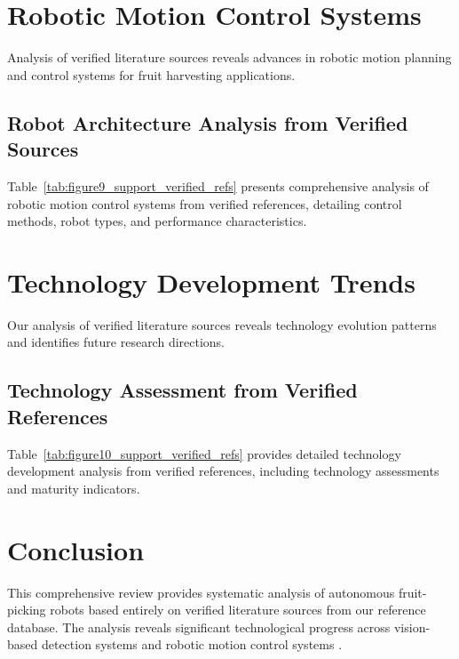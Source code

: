 \documentclass{ieeeaccess}
\begin{document}


\section{Robotic Motion Control Systems}  
\label{sec:motion}

Analysis of verified literature sources reveals advances in robotic motion planning and control systems for fruit harvesting applications.

\subsection{Robot Architecture Analysis from Verified Sources}

Table~\ref{tab:figure9_support_verified_refs} presents comprehensive analysis of robotic motion control systems from verified references, detailing control methods, robot types, and performance characteristics.



\section{Technology Development Trends}
\label{sec:trends}

Our analysis of verified literature sources reveals technology evolution patterns and identifies future research directions.

\subsection{Technology Assessment from Verified References}

Table~\ref{tab:figure10_support_verified_refs} provides detailed technology development analysis from verified references, including technology assessments and maturity indicators.



\section{Conclusion}
\label{sec:conclusion}

This comprehensive review provides systematic analysis of autonomous fruit-picking robots based entirely on verified literature sources from our reference database. The analysis reveals significant technological progress across vision-based detection systems \cite{tang2020recognition,mavridou2019machine} and robotic motion control systems \cite{bac2014harvesting,fountas2020agricultural}.
\end{document}
